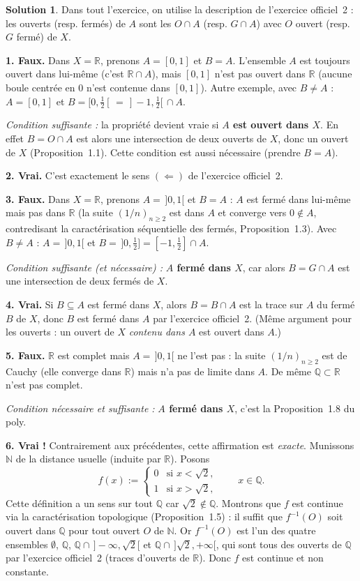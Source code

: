 \documentclass[11pt,a4paper]{article}
\newcommand{\R}{\mathbb{R}}
\newcommand{\N}{\mathbb{N}}
\newcommand{\Q}{\mathbb{Q}}
\theoremstyle{definition}
\newtheorem*{solution}{Solution}
\begin{document}
\begin{solution}
Dans tout l'exercice, on utilise la description de l'exercice officiel~2 : les ouverts (resp. fermés) de $A$ sont les $O\cap A$ (resp. $G\cap A$) avec $O$ ouvert (resp. $G$ fermé) de $X$.

\medskip
\noindent\textbf{1. Faux.} Dans $X=\R$, prenons $A=[0,1]$ et $B=A$. L'ensemble $A$ est toujours ouvert dans lui-même (c'est $\R\cap A$), mais $[0,1]$ n'est pas ouvert dans $\R$ (aucune boule centrée en $0$ n'est contenue dans $[0,1]$). Autre exemple, avec $B\neq A$ : $A=[0,1]$ et $B=[0,\tfrac12[\,=\,]-1,\tfrac12[\,\cap A$.

\emph{Condition suffisante :} la propriété devient vraie si \textbf{$A$ est ouvert dans $X$}. En effet $B=O\cap A$ est alors une intersection de deux ouverts de $X$, donc un ouvert de $X$ (Proposition~1.1). Cette condition est aussi nécessaire (prendre $B=A$).

\medskip
\noindent\textbf{2. Vrai.} C'est exactement le sens $(\Leftarrow)$ de l'exercice officiel~2.

\medskip
\noindent\textbf{3. Faux.} Dans $X=\R$, prenons $A=\,]0,1[$ et $B=A$ : $A$ est fermé dans lui-même mais pas dans $\R$ (la suite $(1/n)_{n\ge2}$ est dans $A$ et converge vers $0\notin A$, contredisant la caractérisation séquentielle des fermés, Proposition~1.3). Avec $B\neq A$ : $A=\,]0,1[$ et $B=\,]0,\tfrac12]=[-1,\tfrac12]\cap A$.

\emph{Condition suffisante (et nécessaire) :} \textbf{$A$ fermé dans $X$}, car alors $B=G\cap A$ est une intersection de deux fermés de $X$.

\medskip
\noindent\textbf{4. Vrai.} Si $B\subseteq A$ est fermé dans $X$, alors $B=B\cap A$ est la trace sur $A$ du fermé $B$ de $X$, donc $B$ est fermé dans $A$ par l'exercice officiel~2. (Même argument pour les ouverts : un ouvert de $X$ \emph{contenu dans $A$} est ouvert dans $A$.)

\medskip
\noindent\textbf{5. Faux.} $\R$ est complet mais $A=\,]0,1[$ ne l'est pas : la suite $(1/n)_{n\ge2}$ est de Cauchy (elle converge dans $\R$) mais n'a pas de limite dans $A$. De même $\Q\subset\R$ n'est pas complet.

\emph{Condition nécessaire et suffisante :} \textbf{$A$ fermé dans $X$}, c'est la Proposition~1.8 du poly.

\medskip
\noindent\textbf{6. Vrai !} Contrairement aux précédentes, cette affirmation est \emph{exacte}. Munissons $\N$ de la distance usuelle (induite par $\R$). Posons
\[
f(x) := \begin{cases} 0 & \text{si } x<\sqrt2,\\ 1 & \text{si } x>\sqrt2,\end{cases}\qquad x\in\Q .
\]
Cette définition a un sens sur tout $\Q$ car $\sqrt2\notin\Q$. Montrons que $f$ est continue via la caractérisation topologique (Proposition~1.5) : il suffit que $f^{-1}(O)$ soit ouvert dans $\Q$ pour tout ouvert $O$ de $\N$. Or $f^{-1}(O)$ est l'un des quatre ensembles $\emptyset$, $\Q$, $\Q\cap\,]-\infty,\sqrt2[$ et $\Q\cap\,]\sqrt2,+\infty[$, qui sont tous des ouverts de $\Q$ par l'exercice officiel~2 (traces d'ouverts de $\R$). Donc $f$ est continue et non constante.
\end{solution}
\end{document}
